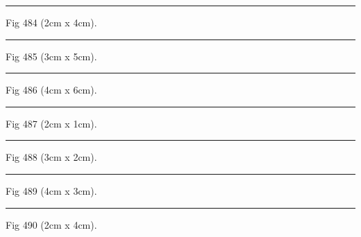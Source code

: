 \documentclass[a4paper,11pt]{article}
\begin{document}
\begin{swarmwrap}%
  \begin{minipage}[t]{2cm}
    \centering
    \rule{\linewidth}{4cm}
    {\footnotesize Fig 484 (2cm x 4cm).}
  \end{minipage}%
\end{swarmwrap}%
\swarmwrapnext
\lipsum[34]%

\begin{swarmwrap}%
  \begin{minipage}[t]{3cm}
    \centering
    \rule{\linewidth}{5cm}
    {\footnotesize Fig 485 (3cm x 5cm).}
  \end{minipage}%
\end{swarmwrap}%
\swarmwrapnext
\lipsum[35]%

\begin{swarmwrap}%
  \begin{minipage}[t]{4cm}
    \centering
    \rule{\linewidth}{6cm}
    {\footnotesize Fig 486 (4cm x 6cm).}
  \end{minipage}%
\end{swarmwrap}%
\swarmwrapnext
\lipsum[36]%

\begin{swarmwrap}%
  \begin{minipage}[t]{2cm}
    \centering
    \rule{\linewidth}{1cm}
    {\footnotesize Fig 487 (2cm x 1cm).}
  \end{minipage}%
\end{swarmwrap}%
\swarmwrapnext
\lipsum[37]%

\begin{swarmwrap}%
  \begin{minipage}[t]{3cm}
    \centering
    \rule{\linewidth}{2cm}
    {\footnotesize Fig 488 (3cm x 2cm).}
  \end{minipage}%
\end{swarmwrap}%
\swarmwrapnext
\lipsum[38]%

\begin{swarmwrap}%
  \begin{minipage}[t]{4cm}
    \centering
    \rule{\linewidth}{3cm}
    {\footnotesize Fig 489 (4cm x 3cm).}
  \end{minipage}%
\end{swarmwrap}%
\swarmwrapnext
\lipsum[39]%

\begin{swarmwrap}%
  \begin{minipage}[t]{2cm}
    \centering
    \rule{\linewidth}{4cm}
    {\footnotesize Fig 490 (2cm x 4cm).}
  \end{minipage}%
\end{swarmwrap}%
\swarmwrapnext
\lipsum[40]%
\end{document}
